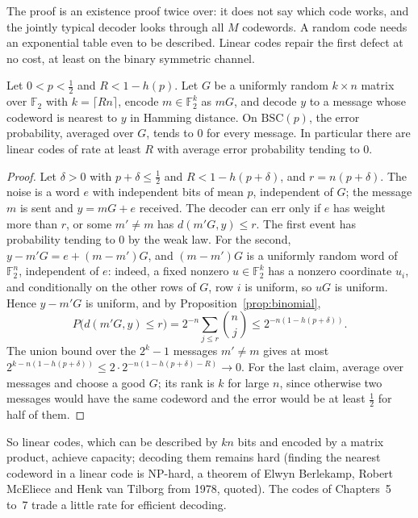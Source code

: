 The proof is an existence proof twice over: it does not say which code works, and the jointly typical decoder looks through all $M$ codewords. A random code needs an exponential table even to be described. Linear codes repair the first defect at no cost, at least on the binary symmetric channel.

\begin{theorem}[Elias 1955]\label{thm:linearcap}
Let $0<p<\frac12$ and $R<1-h(p)$. Let $G$ be a uniformly random $k\times n$ matrix over $\mathbb F_2$ with $k=\lceil Rn\rceil$, encode $m\in\mathbb F_2^k$ as $mG$, and decode $y$ to a message whose codeword is nearest to $y$ in Hamming distance. On $\mathrm{BSC}(p)$, the error probability, averaged over $G$, tends to $0$ for every message. In particular there are linear codes of rate at least $R$ with average error probability tending to $0$.
\end{theorem}

\begin{proof}
Let $\delta>0$ with $p+\delta\le\frac12$ and $R<1-h(p+\delta)$, and $r=n(p+\delta)$. The noise is a word $e$ with independent bits of mean $p$, independent of $G$; the message $m$ is sent and $y=mG+e$ received. The decoder can err only if $e$ has weight more than $r$, or some $m'\ne m$ has $d(m'G,y)\le r$. The first event has probability tending to $0$ by the weak law. For the second, $y-m'G=e+(m-m')G$, and $(m-m')G$ is a uniformly random word of $\mathbb F_2^n$, independent of $e$: indeed, a fixed nonzero $u\in\mathbb F_2^k$ has a nonzero coordinate $u_i$, and conditionally on the other rows of $G$, row $i$ is uniform, so $uG$ is uniform. Hence $y-m'G$ is uniform, and by Proposition~\ref{prop:binomial},
\[
P\bigl(d(m'G,y)\le r\bigr)=2^{-n}\sum_{j\le r}\binom nj\le2^{-n(1-h(p+\delta))}.
\]
The union bound over the $2^k-1$ messages $m'\ne m$ gives at most $2^{k-n(1-h(p+\delta))}\le2\cdot2^{-n(1-h(p+\delta)-R)}\to0$. For the last claim, average over messages and choose a good $G$; its rank is $k$ for large $n$, since otherwise two messages would have the same codeword and the error would be at least $\frac12$ for half of them.
\end{proof}

So linear codes, which can be described by $kn$ bits and encoded by a matrix product, achieve capacity; decoding them remains hard (finding the nearest codeword in a linear code is NP-hard, a theorem of Elwyn Berlekamp, Robert McEliece and Henk van Tilborg from 1978, quoted). The codes of Chapters~5 to~7 trade a little rate for efficient decoding.

